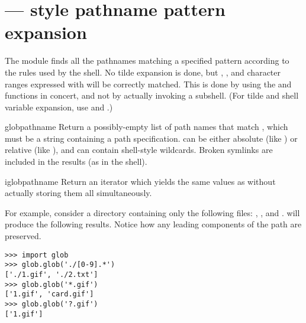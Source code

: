 \section{ ---
         \UNIX{} style pathname pattern expansion}



The  module finds all the pathnames matching a specified
pattern according to the rules used by the \UNIX{} shell.  No tilde
expansion is done, but \code{*}, , and character ranges
expressed with \code{[]} will be correctly matched.  This is done by
using the  and 
functions in concert, and not by actually invoking a subshell.  (For
tilde and shell variable expansion, use 
and .)

\begin{funcdesc}{glob}{pathname}
Return a possibly-empty list of path names that match ,
which must be a string containing a path specification.
 can be either absolute (like
) or relative (like
), and can contain shell-style wildcards.
Broken symlinks are included in the results (as in the shell).
\end{funcdesc}

\begin{funcdesc}{iglob}{pathname}
Return an iterator which yields the same values as 
without actually storing them all simultaneously.
\end{funcdesc}

For example, consider a directory containing only the following files:
, , and .  
will produce the following results.  Notice how any leading components
of the path are preserved.

\begin{verbatim}
>>> import glob
>>> glob.glob('./[0-9].*')
['./1.gif', './2.txt']
>>> glob.glob('*.gif')
['1.gif', 'card.gif']
>>> glob.glob('?.gif')
['1.gif']
\end{verbatim}


\begin{seealso}
\end{seealso}
